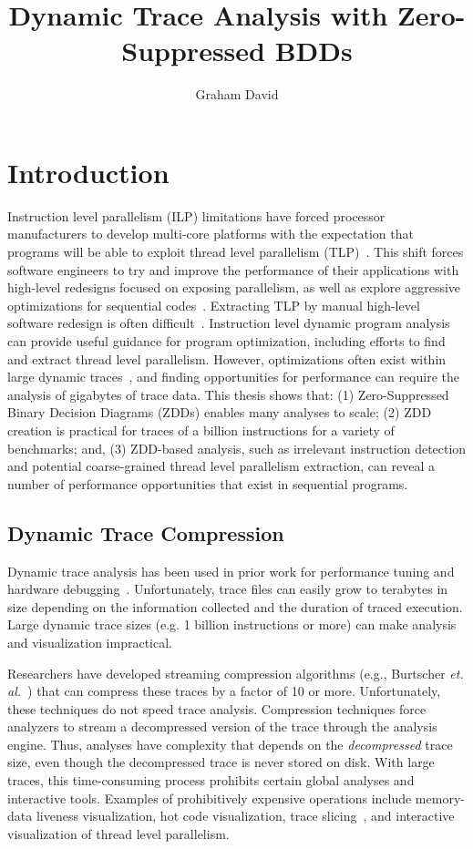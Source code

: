 \documentclass[defaultstyle,11pt]{thesis}
\title{Dynamic Trace Analysis with Zero-Suppressed BDDs}
\author{Graham David}{Price}
\begin{document}
\chapter{Introduction}

Instruction level parallelism (ILP) limitations have forced processor
manufacturers to develop multi-core platforms with the expectation
that programs will be able to exploit thread level parallelism
(TLP)~\cite{ali-reza:2007:ppopp, intel:2005:dual, intel:2005:dual2}.
This shift forces software engineers to try and improve the
performance of their applications with high-level redesigns focused on
exposing parallelism, as well as explore aggressive optimizations for
sequential codes~\cite{park:2001lr, herlihy:2006:oopsla}. Extracting
TLP by manual high-level software redesign is often
difficult~\cite{herlihy:2008:art}. Instruction level dynamic program
analysis can provide useful guidance for program optimization,
including efforts to find and extract thread level parallelism.
However, optimizations often exist within large dynamic
traces~\cite{iyer:05:epic}, and finding opportunities for performance
can require the analysis of gigabytes of trace data.  This thesis
shows that: (1) Zero-Suppressed Binary Decision Diagrams (ZDDs)
enables many analyses to scale; (2) ZDD creation is practical for
traces of a billion instructions for a variety of benchmarks; and, (3)
ZDD-based analysis, such as irrelevant instruction detection and
potential coarse-grained thread level parallelism extraction, can
reveal a number of performance opportunities that exist in sequential
programs.

\section{Dynamic Trace Compression}

Dynamic trace analysis has been used in prior work for performance
tuning and hardware debugging~\cite{wu:94:micro}. Unfortunately, trace
files can easily grow to terabytes in size depending on the
information collected and the duration of traced execution.  Large
dynamic trace sizes (e.g. 1 billion instructions or more) can make
analysis and visualization impractical.

Researchers have developed streaming compression algorithms (e.g.,
Burtscher \textit{et. al.}~\cite{burtscher:05:cgo}) that can compress
these traces by a factor of 10 or more.  Unfortunately, these
techniques do not speed trace analysis.  Compression techniques force
analyzers to stream a decompressed version of the trace through the
analysis engine.  Thus, analyses have complexity that depends on the
\textit{decompressed} trace size, even though the decompressed trace
is never stored on disk.  With large traces, this time-consuming
process prohibits certain global analyses and interactive tools.
Examples of prohibitively expensive operations include memory-data
liveness visualization, hot code visualization, trace
slicing~\cite{zhang:04:icse}, and interactive visualization of thread
level parallelism.
\end{document}
